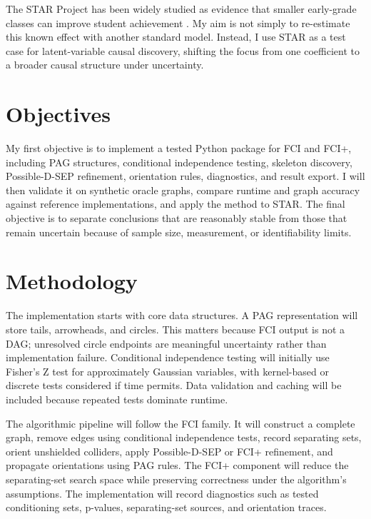 \documentclass[11pt,a4paper]{article}
\begin{document}
The STAR Project has been widely studied as evidence that smaller early-grade classes can improve student achievement \citep{word1990student,krueger1999experimental}. My aim is not simply to re-estimate this known effect with another standard model. Instead, I use STAR as a test case for latent-variable causal discovery, shifting the focus from one coefficient to a broader causal structure under uncertainty.

\section*{Objectives}

My first objective is to implement a tested Python package for FCI and FCI+, including PAG structures, conditional independence testing, skeleton discovery, Possible-D-SEP refinement, orientation rules, diagnostics, and result export. I will then validate it on synthetic oracle graphs, compare runtime and graph accuracy against reference implementations, and apply the method to STAR. The final objective is to separate conclusions that are reasonably stable from those that remain uncertain because of sample size, measurement, or identifiability limits.

\section*{Methodology}

The implementation starts with core data structures. A PAG representation will store tails, arrowheads, and circles. This matters because FCI output is not a DAG; unresolved circle endpoints are meaningful uncertainty rather than implementation failure. Conditional independence testing will initially use Fisher's Z test for approximately Gaussian variables, with kernel-based or discrete tests considered if time permits. Data validation and caching will be included because repeated tests dominate runtime.

The algorithmic pipeline will follow the FCI family. It will construct a complete graph, remove edges using conditional independence tests, record separating sets, orient unshielded colliders, apply Possible-D-SEP or FCI+ refinement, and propagate orientations using PAG rules. The FCI+ component will reduce the separating-set search space while preserving correctness under the algorithm's assumptions. The implementation will record diagnostics such as tested conditioning sets, p-values, separating-set sources, and orientation traces.
\end{document}
